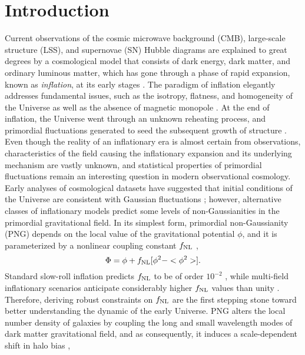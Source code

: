 \section{Introduction}
\label{sec:introduction}
Current observations of the cosmic microwave background (CMB), large-scale structure (LSS), and supernovae (SN) Hubble diagrams are explained to great degrees by a cosmological model that consists of dark energy, dark matter, and ordinary luminous matter, which has gone through a phase of rapid expansion, known as \textit{inflation}, at its early stages \citep[see, e.g.,][]{weinberg2013observational}. The paradigm of inflation elegantly addresses fundamental issues, such as the isotropy, flatness, and homogeneity of the Universe as well as the absence of magnetic monopole \citep[see, e.g.,][]{weinberg2008cosmology}. At the end of inflation, the Universe went through an unknown reheating process, and primordial fluctuations generated to seed the subsequent growth of structure \citep{kofman1994reheating, bassett2006inflation, lyth2009primordial}. Even though the reality of an inflationary era is almost certain from observations, characteristics of the field causing the inflationary expansion and its underlying mechanism are vastly unknown, and statistical properties of primordial fluctuations remain an interesting question in modern observational cosmology. Early analyses of cosmological datasets have suggested that initial conditions of the Universe are consistent with Gaussian fluctuations \citep{guth2005inflationary}; however, alternative classes of inflationary models predict some levels of non-Gaussianities in the primordial gravitational field. In its simplest form, primordial non-Gaussianity (PNG) depends on the local value of the gravitational potential $\phi$, and it is parameterized by a nonlinear coupling constant $f_{\rm NL}$ \citep{komatsu2001acoustic},
\begin{equation}
 \Phi = \phi + f_{\rm NL} [\phi^{2} - <\phi^{2}>].
\end{equation}
Standard slow-roll inflation predicts $f_{\rm NL}$ to be of order $10^{-2}$ \citep[see, e.g.,][for a review]{alvarez2014arXiv1412.4671A}, while multi-field inflationary scenarios anticipate considerably higher $f_{\rm NL}$ values than unity \citep[see, e.g.,][]{de2017next}. Therefore, deriving robust constraints on $f_{\rm NL}$ are the first stepping stone toward better understanding the dynamic of the early Universe. PNG alters the local number density of galaxies by coupling the long and small wavelength modes of dark matter gravitational field, and as consequently, it induces a scale-dependent shift in halo bias \citep[see, e.g.,][]{dalal2008imprints, slosar2008constraints},
